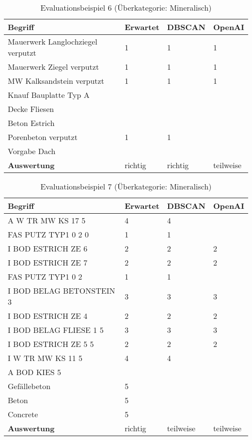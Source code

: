 \begin{table}[h]
	
	\centering
	\begin{tabular}{|l|l|l|l|}
		\hline
		\textbf{Begriff} & \textbf{Erwartet} & \textbf{DBSCAN} & \textbf{OpenAI}\\ \hline
		  Mauerwerk Langlochziegel verputzt & 1 & 1 & 1 \\ \hline
		Mauerwerk Ziegel verputzt & 1 & 1 & 1 \\ \hline
		MW Kalksandstein verputzt & 1 & 1 & 1 \\ \hline
		Knauf Bauplatte Typ A & ~ & ~ & ~ \\ \hline
		Decke Fliesen & ~ & ~ & ~ \\ \hline
		Beton Estrich & ~ & ~ & ~ \\ \hline
		Porenbeton verputzt & 1 & 1 & ~ \\ \hline
		Vorgabe Dach & ~ & ~ & ~ \\ \hline
		\textbf{Auswertung} & richtig & richtig & teilweise \\ \hline
	\end{tabular}
	\caption{Evaluationsbeispiel 6 (Überkategorie: Mineralisch)}
	\label{t:evaluation-example6}
\end{table}

\begin{table}[h]
	
	\centering
	\begin{tabular}{|l|l|l|l|}
		\hline
		\textbf{Begriff} & \textbf{Erwartet} & \textbf{DBSCAN} & \textbf{OpenAI}\\ \hline
		 A W TR MW KS 17 5 & 4 & 4 & ~ \\ \hline
		FAS PUTZ TYP1 0 2 0 & 1 & 1 & ~ \\ \hline
		I BOD ESTRICH ZE 6 & 2 & 2 & 2 \\ \hline
		I BOD ESTRICH ZE 7 & 2 & 2 & 2 \\ \hline
		FAS PUTZ TYP1 0 2 & 1 & 1 & ~ \\ \hline
		I BOD BELAG BETONSTEIN 3 & 3 & 3 & 3 \\ \hline
		I BOD ESTRICH ZE 4 & 2 & 2 & 2 \\ \hline
		I BOD BELAG FLIESE 1 5 & 3 & 3 & 3 \\ \hline
		I BOD ESTRICH ZE 5 5 & 2 & 2 & 2 \\ \hline
		I W TR MW KS 11 5 & 4 & 4 & ~ \\ \hline
		A BOD KIES 5 & ~ & ~ & ~ \\ \hline
		Gefällebeton & 5 & ~ & ~ \\ \hline
		Beton & 5 & ~ & ~ \\ \hline
		Concrete & 5 & ~ & ~ \\ \hline
		\textbf{Auswertung} & richtig & teilweise & teilweise \\ \hline
	\end{tabular}
	\caption{Evaluationsbeispiel 7 (Überkategorie: Mineralisch)}
	\label{t:evaluation-example7}
\end{table}

